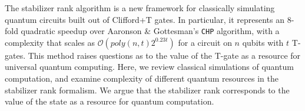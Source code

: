 \documentclass{standalone}
\begin{document}
The stabilizer rank algorithm is a new framework for classically simulating quantum circuits built out of Clifford+T gates. In particular, it represents an 8-fold quadratic speedup over Aaronson \& Gottesman's \texttt{CHP} algorithm, with a complexity that scales as $\mathcal{O}(poly(n,t)2^{0.23 t})$ for a circuit on $n$ qubits with $t$ T-gates. This method raises questions as to the value of the T-gate as a resource for universal quantum computing. Here, we review classical simulations of quantum computation, and examine complexity of different quantum resources in the stabilizer rank formalism. We argue that the stabilizer rank corresponds to the value of the state as a resource for quantum computation. 

\ifstandalone

\fi
\end{document}
